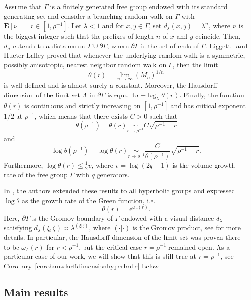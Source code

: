 \documentclass{amsart}
\theoremstyle{definition}
\theoremstyle{remark}
\begin{document}
Assume that $\Gamma$ is a finitely generated free group endowed with its standard generating set and consider a branching random walk on $\Gamma$ with $\mathbf E[\nu]=r\in [1,\rho^{-1}]$.
Let $\lambda<1$ and for $x,y\in \Gamma$, set $d_\lambda(x,y)=\lambda^{n}$, where $n$ is the biggest integer such that the prefixes of length $n$ of $x$ and $y$ coincide.
Then, $d_\lambda$ extends to a distance on $\Gamma \cup \partial \Gamma$, where $\partial \Gamma$ is the set of ends of $\Gamma$.
Liggett~\cite{Liggett96} and Hueter-Lalley \cite{HL00} proved that whenever the underlying random walk is %
a symmetric, possibly anisotropic, nearest neighbor random walk on $\Gamma$, then the limit
$$\theta(r)=\lim_{n \to \infty} \left( M_n \right)^{1/n}$$
is well defined and is almost surely a constant.
Moreover, the Hausdorff dimension of the limit set $\Lambda$ in $\partial \Gamma$ is equal to $- \log_{\lambda} \theta(r)$.
Finally, the function $\theta(r)$ is continuous and strictly increasing on $[1,\rho^{-1}]$ and has critical exponent $1/2$ at $\rho^{-1}$, which means that
there exists $C>0$ such that
$$\theta(\rho^{-1})-\theta(r)\underset{r\to \rho^{-1}}{\sim}C\sqrt{\rho^{-1}-r}$$
and
$$\log \theta(\rho^{-1})-\log \theta(r)\underset{r\to \rho^{-1}}{\sim}\frac{C}{\theta(\rho^{-1})}\sqrt{\rho^{-1}-r}.$$
Furthermore, $\log \theta(r)\leq \frac{1}{2}v$, where $v=\log (2q-1)$ is the volume growth rate of the free group $\Gamma$ with $q$ generators. %

In \cite{SWX}, the authors extended these results to all hyperbolic groups and expressed $\log \theta$ as the growth rate of the Green function, i.e.
$$\theta(r)=\mathrm{e}^{\omega_\Gamma(r)}.$$
Here, $\partial \Gamma$ is the Gromov boundary of $\Gamma$ endowed with a visual distance $d_\lambda$ satisfying
$d_\lambda(\xi,\zeta)\asymp \lambda^{(\xi|\zeta)}$, where $(\cdot|\cdot)$ is the Gromov product,  see \cite[Section~2.1]{SWX} for more details.
In particular,   the Hausdorff dimension of the limit set was proven there to be   $\omega_\Gamma(r)$ for $r<\rho^{-1}$, but the critical case $r=\rho^{-1}$ remained open.
As a particular case of our work, we will show that this is still true at $r=\rho^{-1}$, see Corollary~\ref{corohausdorffdimensionhyperbolic} below.




\subsection{Main results}
\end{document}
